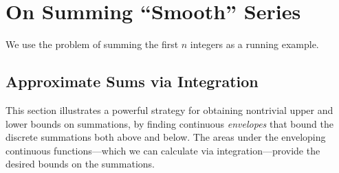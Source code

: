 \documentclass{article}
\begin{document}
\section{On Summing ``Smooth'' Series}
\label{sec:smooth-series}

We use the problem of summing the first $n$ integers as a running
example.

\subsection{Approximate Sums via Integration}
\label{sec:riemann-bounds}

This section illustrates a powerful strategy for obtaining nontrivial
upper and lower bounds on summations, by finding continuous {\em
  envelopes} that bound the discrete summations both above and below.
The areas under the enveloping continuous functions---which we can
calculate via integration---provide the desired bounds on the
summations.
\end{document}
